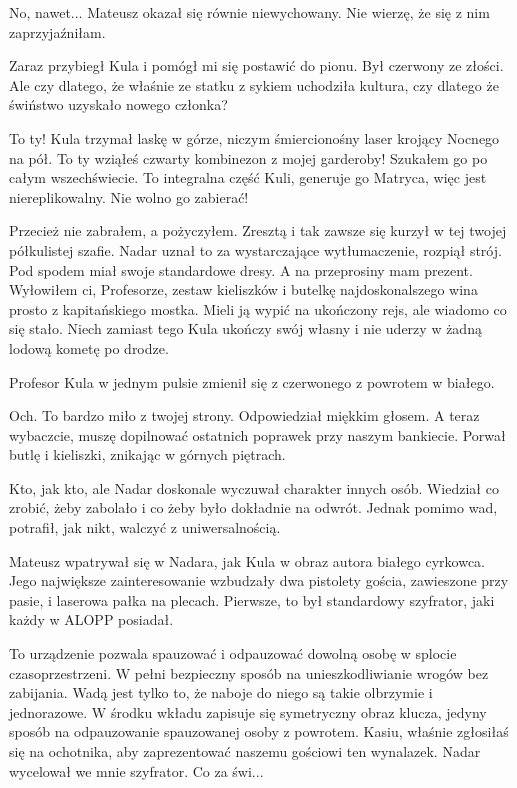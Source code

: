 \ds{} No, nawet... \dm{} Mateusz okazał się równie niewychowany. Nie wierzę, że się z nim zaprzyjaźniłam. \de{}

Zaraz przybiegł Kula i pomógł mi się postawić do pionu. Był czerwony ze złości.
Ale czy dlatego, że właśnie ze statku z sykiem uchodziła kultura, czy dlatego że świństwo uzyskało nowego członka?

\ds{} To ty! \dm{} Kula trzymał laskę w górze, niczym śmiercionośny laser krojący Nocnego na pół. \dm{} To ty wziąłeś czwarty kombinezon z mojej garderoby! Szukałem go po całym wszechświecie. To integralna część Kuli, generuje go Matryca, więc jest niereplikowalny. Nie wolno go zabierać! \de{}

\ds{} Przecież nie zabrałem, a pożyczyłem. Zresztą i tak zawsze się kurzył w tej twojej półkulistej szafie. \dm{}
Nadar uznał to za wystarczające wytłumaczenie, rozpiął strój. Pod spodem miał swoje standardowe dresy. \dm{} 
A na przeprosiny mam prezent. Wyłowiłem ci, Profesorze, zestaw kieliszków i butelkę najdoskonalszego wina prosto z kapitańskiego mostka.
Mieli ją wypić na ukończony rejs, ale wiadomo co się stało. Niech zamiast tego Kula ukończy swój własny i nie uderzy w żadną lodową kometę po drodze. \de{}

Profesor Kula w jednym pulsie zmienił się z czerwonego z powrotem w białego.

\ds{} Och. To bardzo miło z twojej strony. \dm{} Odpowiedział miękkim głosem. \dm{} A teraz wybaczcie, muszę dopilnować ostatnich poprawek przy naszym bankiecie. \dm{}
Porwał butlę i kieliszki, znikając w górnych piętrach.

Kto, jak kto, ale Nadar doskonale wyczuwał charakter innych osób.
Wiedział co zrobić, żeby zabolało i co żeby było dokładnie na odwrót.
Jednak pomimo wad, potrafił, jak nikt, walczyć z uniwersalnością.

Mateusz wpatrywał się w Nadara, jak Kula w obraz autora białego cyrkowca.
Jego największe zainteresowanie wzbudzały dwa pistolety gościa, zawieszone przy pasie, i laserowa pałka na plecach.
Pierwsze, to był standardowy szyfrator, jaki każdy w ALOPP posiadał.

\ds{} To urządzenie pozwala spauzować i odpauzować dowolną osobę w splocie czasoprzestrzeni.
W pełni bezpieczny sposób na unieszkodliwianie wrogów bez zabijania.
Wadą jest tylko to, że naboje do niego są takie olbrzymie i jednorazowe.
W środku wkładu zapisuje się symetryczny obraz klucza, jedyny sposób na odpauzowanie spauzowanej osoby z powrotem.
Kasiu, właśnie zgłosiłaś się na ochotnika, aby zaprezentować naszemu gościowi ten wynalazek. \dm{} Nadar wycelował we mnie szyfrator. Co za świ...

